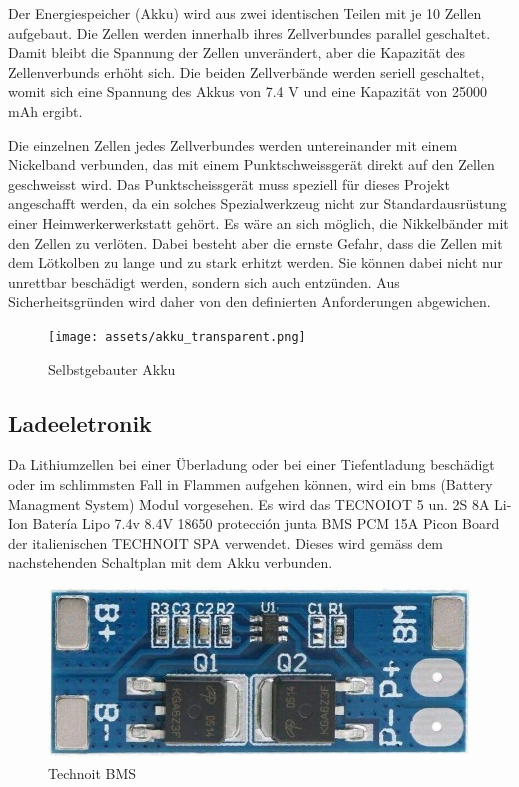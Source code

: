    
Der Energiespeicher (Akku) wird aus zwei identischen Teilen mit je 10 Zellen aufgebaut. Die Zellen werden innerhalb ihres Zellverbundes parallel geschaltet. Damit bleibt die Spannung der Zellen unverändert, aber die Kapazität des Zellenverbunds erhöht sich. Die beiden Zellverbände werden seriell geschaltet, womit sich eine Spannung des Akkus von 7.4 V und eine Kapazität von 25000 mAh ergibt.

Die einzelnen Zellen jedes Zellverbundes werden untereinander mit einem Nickelband verbunden, das mit einem Punktschweissgerät direkt auf den Zellen geschweisst wird. Das Punktscheissgerät muss speziell für dieses Projekt angeschafft werden, da ein solches Spezialwerkzeug nicht zur Standardausrüstung einer Heimwerkerwerkstatt gehört. Es wäre an sich möglich, die Nikkelbänder mit den Zellen zu verlöten. Dabei besteht aber die ernste Gefahr, dass die Zellen mit dem Lötkolben zu lange und zu stark erhitzt werden. Sie können dabei nicht nur unrettbar beschädigt werden, sondern sich auch entzünden. Aus Sicherheitsgründen wird daher von den definierten Anforderungen abgewichen.
 \begin{figure}
 \centering
    \texttt{[image: assets/akku\_transparent.png]}
    \caption{Selbstgebauter Akku}
    \label{fig:enter-label}
\end{figure}
\subsection{Ladeeletronik}

Da Lithiumzellen bei einer Überladung oder bei einer Tiefentladung beschädigt oder im schlimmsten Fall in Flammen aufgehen können, wird ein \ac{bms} (Battery Managment System) Modul vorgesehen. Es wird das 
TECNOIOT 5 un. 2S 8A Li-Ion Batería Lipo 7.4v 8.4V 18650 protección junta BMS PCM 15A Picon Board der italienischen TECHNOIT SPA verwendet. Dieses wird gemäss dem nachstehenden Schaltplan mit dem Akku verbunden.
\begin{figure}[H]
    \centering
    \includegraphics[width=0.5\linewidth]{assets/Tecnoiot.png}
    \caption{Technoit BMS}
    \label{fig:enter-label}
\end{figure}

